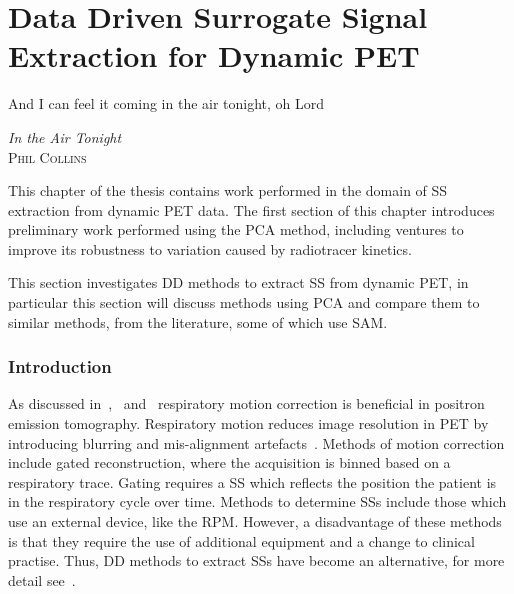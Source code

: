 \chapter{Data Driven Surrogate Signal Extraction for Dynamic PET} \label{sec:data_driven_surrogate_signal_extraction_for_dynamic_pet}
    \vspace*{\fill}
    \setlength{\epigraphwidth}{0.5\linewidth}
    \renewcommand{\epigraphflush}{flushright}
    \renewcommand{\epigraphsize}{\footnotesize}
    \epigraph{And I can feel it coming in the air tonight, oh Lord}%
              {\textit{In the Air Tonight}\\ \textsc{Phil Collins}}
    
    \newpage
    
        This chapter of the thesis contains work performed in the domain of \gls{SS} extraction from dynamic \gls{PET} data. The first section of this chapter introduces preliminary work performed using the \gls{PCA} method, including ventures to improve its robustness to variation caused by radiotracer kinetics.
    
        This section investigates \gls{DD} methods to extract \gls{SS} from dynamic \gls{PET}, in particular this section will discuss methods using \gls{PCA} and compare them to similar methods, from the literature, some of which use \gls{SAM}.
        
        \subsection{Introduction} \label{sec:pca_data_driven_surrogate_signal_extraction_methods_for_dynamic_pet_introduction}
            As discussed in~,~ and~ respiratory motion correction is beneficial in positron emission tomography. Respiratory motion reduces image resolution in \gls{PET} by introducing blurring and mis-alignment artefacts~\parencite{Nehmeh2008a}. Methods of motion correction include gated reconstruction, where the acquisition is binned based on a respiratory trace. Gating requires a \gls{SS} which reflects the position the patient is in the respiratory cycle over time. Methods to determine \glspl{SS} include those which use an external device, like the \gls{RPM}. However, a disadvantage of these methods is that they require the use of additional equipment and a change to clinical practise. Thus, \gls{DD} methods to extract \glspl{SS} have become an alternative, for more detail see~. 
            

